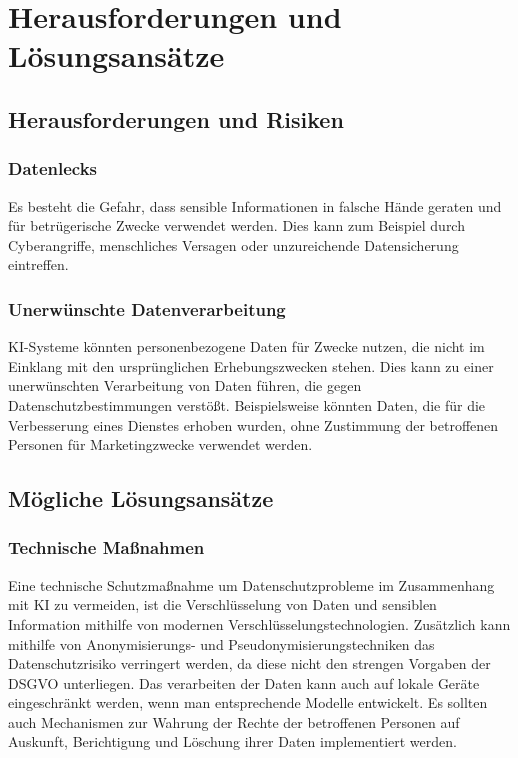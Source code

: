 \chapter{Herausforderungen und Lösungsansätze}

\section{Herausforderungen und Risiken}

\subsection{Datenlecks}

Es besteht die Gefahr, dass sensible Informationen in falsche Hände geraten und
für betrügerische Zwecke verwendet werden. Dies kann zum Beispiel durch
Cyberangriffe, menschliches Versagen oder unzureichende Datensicherung
eintreffen.

\cite{digitalesinstitut2024}

\subsection{Unerwünschte Datenverarbeitung}

KI-Systeme könnten personenbezogene Daten für Zwecke nutzen, die nicht im
Einklang mit den ursprünglichen Erhebungszwecken stehen. Dies kann zu einer
unerwünschten Verarbeitung von Daten führen, die gegen Datenschutzbestimmungen
verstößt. Beispielsweise könnten Daten, die für die Verbesserung eines Dienstes
erhoben wurden, ohne Zustimmung der betroffenen Personen für Marketingzwecke
verwendet werden.

\cite{digitalesinstitut2024}

\section{Mögliche Lösungsansätze}

\subsection{Technische Maßnahmen}

Eine technische Schutzmaßnahme um Datenschutzprobleme im Zusammenhang mit KI zu
vermeiden, ist die Verschlüsselung von Daten und sensiblen Information mithilfe
von modernen Verschlüsselungstechnologien. Zusätzlich kann mithilfe von
Anonymisierungs- und Pseudonymisierungstechniken das Datenschutzrisiko
verringert werden, da diese nicht den strengen Vorgaben der DSGVO unterliegen.
Das verarbeiten der Daten kann auch auf lokale Geräte eingeschränkt werden, wenn
man entsprechende Modelle entwickelt. Es sollten auch Mechanismen zur Wahrung
der Rechte der betroffenen Personen auf Auskunft, Berichtigung und Löschung
ihrer Daten implementiert werden.

